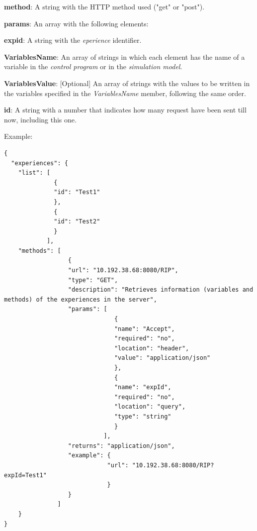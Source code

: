 \begin{myEnumerate}
\begin{myEnumerate}
\begin{myEnumerate}
\begin{myEnumerate}
\begin{myEnumerate}
                        \item \textbf{method}: A string with the HTTP method used ("get" or "post").
                        \item \textbf{params}: An array with the following elements:
                        \begin{myEnumerate}
                            \item \textbf{expid}: A string with the \textit{eperience} identifier.
                            \item \textbf{VariablesName}: An array of strings in which each element has the name of a variable in the \textit{control program} or in the \textit{simulation model}.
                            \item \textbf{VariablesValue}: [Optional] An array of strings with the values to be written in the variables specified in the \textit{VariablesName} member, following the same order.
                        \end{myEnumerate}
                        \item \textbf{id}: A string with a number that indicates how many request have been sent till now, including this one.
                    \end{myEnumerate}
            \end{myEnumerate}
        \end{myEnumerate}
    \end{myEnumerate}
\end{myEnumerate}

Example:

\begin{lstlisting}
{
  "experiences": {
    "list": [
              {
              "id": "Test1"
              },
              {
              "id": "Test2"
              }
            ],
    "methods": [
                  {
                  "url": "10.192.38.68:8080/RIP",
                  "type": "GET",
                  "description": "Retrieves information (variables and methods) of the experiences in the server",
                  "params": [
                               {
                               "name": "Accept",
                               "required": "no",
                               "location": "header",
                               "value": "application/json"
                               },
                               {
                               "name": "expId",
                               "required": "no",
                               "location": "query",
                               "type": "string" 
                               }
                            ],
                  "returns": "application/json",
                  "example": {
                             "url": "10.192.38.68:8080/RIP?expId=Test1"
                             }
                  }
               ]
    }
}
\end{lstlisting}

